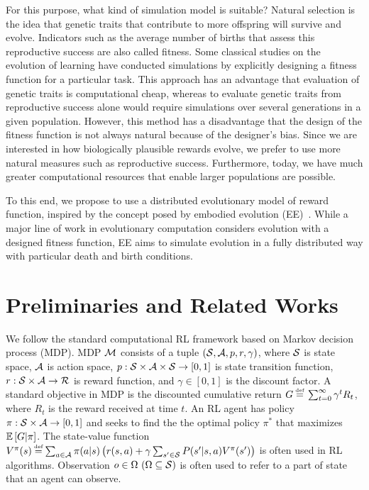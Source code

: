 For this purpose, what kind of simulation model is suitable? Natural selection is the idea that genetic traits that contribute to more offspring will survive and evolve. Indicators such as the average number of births that assess this reproductive success are also called fitness. Some classical studies on the evolution of learning \citep{hintonHowLearningCan1987} have conducted simulations by explicitly designing a fitness function for a particular task. This approach has an advantage that evaluation of genetic traits is computational cheap, whereas to evaluate genetic traits from reproductive success alone would require simulations over several generations in a given population. However, this method has a disadvantage that the design of the fitness function is not always natural because of the designer's bias. Since we are interested in how biologically plausible rewards evolve, we prefer to use more natural measures such as reproductive success. Furthermore, today, we have much greater computational resources that enable larger populations are possible.

To this end, we propose to use a distributed evolutionary model of reward function, inspired by the concept posed by embodied evolution (EE)~\cite{watsonEmbodiedEvolutionDistributing2002}. While a major line of work in evolutionary computation considers evolution with a designed fitness function, EE aims to simulate evolution in a fully distributed way with particular death and birth conditions.

\section{Preliminaries and Related Works}\label{sec:related}
We follow the standard computational RL framework \citep{suttonReinforcementLearningIntroduction2018} based on Markov decision process (MDP). MDP $\mathcal{M}{}$ consists of a tuple $(\mathcal{S}{}, \mathcal{A}{}, p, r, \gamma)$, where $\mathcal{S}{}$ is state space, $\mathcal{A}{}$ is action space, $p: \mathcal{S}\times\mathcal{A}\times \mathcal{S} \rightarrow [0, 1]$ is state transition function, $r: \mathcal{S}\times\mathcal{A} \rightarrow \mathcal{R}$ is reward function, and $\gamma \in [0, 1]$ is the discount factor. A standard objective in MDP is the discounted cumulative return $G \defequal{} \sum_{t=0}^{\infty}\gamma^t R_{t}$, where $R_t$ is the reward received at time $t$. An RL agent has policy $\pi: \mathcal{S} \times \mathcal{A} \rightarrow [0, 1]$ and seeks to find the the optimal policy $\pi^{*}$ that maximizes $\mathbb{E} \left[G|\pi\right]$. The state-value function $V^\pi(s) \defequal \sum_{a \in \A} \pi(a|s) \left( r(s, a) + \gamma \sum_{s' \in \X} P(s'|s, a) V^\pi(s') \right)$ is often used in RL algorithms. Observation $o \in \Omega~(\Omega \subseteq \mathcal{S})$ is often used to refer to a part of state that an agent can observe.

